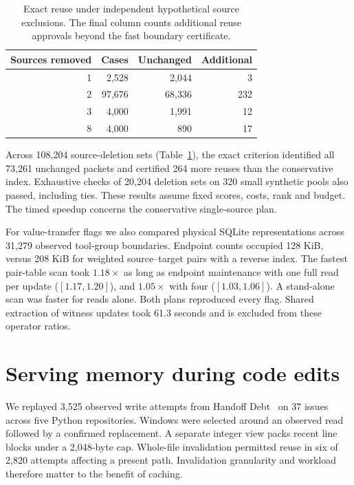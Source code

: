 \documentclass[conference]{IEEEtran}
\begin{document}
\balance
\begin{table}[t]
\caption{Exact reuse under independent hypothetical source exclusions. The final column counts additional reuse approvals beyond the fast boundary certificate.}
\centering\small
\begin{tabular}{rrrr}\toprule
Sources removed & Cases & Unchanged & Additional\\\midrule
1 & 2,528 & 2,044 & 3\\
2 & 97,676 & 68,336 & 232\\
3 & 4,000 & 1,991 & 12\\
8 & 4,000 & 890 & 17\\
\bottomrule\end{tabular}
\label{tab:exclusions}
\end{table}

Across 108,204 source-deletion sets (Table~\ref{tab:exclusions}), the exact criterion identified all 73,261 unchanged packets and certified 264 more reuses than the conservative index. Exhaustive checks of 20,204 deletion sets on 320 small synthetic pools also passed, including ties. These results assume fixed scores, costs, rank and budget. The timed speedup concerns the conservative single-source plan.

For value-transfer flags we also compared physical SQLite representations across 31,279 observed tool-group boundaries. Endpoint counts occupied 128 KiB, versus 208 KiB for weighted source--target pairs with a reverse index. The fastest pair-table scan took $1.18\times$ as long as endpoint maintenance with one full read per update ($[1.17,1.20]$), and $1.05\times$ with four ($[1.03,1.06]$). A stand-alone scan was faster for reads alone. Both plans reproduced every flag. Shared extraction of witness updates took 61.3 seconds and is excluded from these operator ratios.

\section{Serving memory during code edits}
We replayed 3,525 observed write attempts from Handoff Debt~\cite{handoff} on 37 issues across five Python repositories. Windows were selected around an observed read followed by a confirmed replacement. A separate integer view packs recent line blocks under a 2,048-byte cap. Whole-file invalidation permitted reuse in six of 2,820 attempts affecting a present path. Invalidation granularity and workload therefore matter to the benefit of caching.
\end{document}
